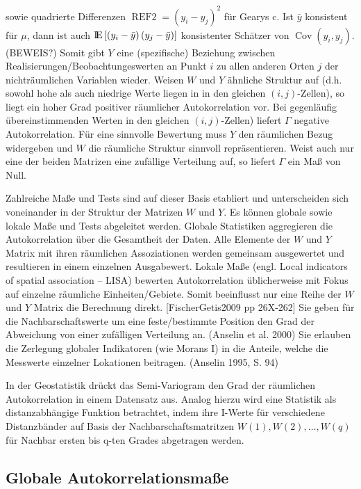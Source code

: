 sowie quadrierte Differenzen $\operatorname{REF2}=\left( y_i-y_j \right)^2$ für Gearys c. 
Ist $\bar{y}$ konsistent für $\mu$, dann ist auch ${\rm I\!E}\left[ \left(y_i-\bar{y}\right)\left(y_j-\bar{y}\right) \right]$ 
konsistenter Schätzer von $\operatorname{Cov} \left( y_i , y_j \right)$. (BEWEIS?)
Somit gibt $Y$ eine (spezifische) Beziehung zwischen Realisierungen/Beobachtungeswerten an Punkt $i$ 
zu allen anderen Orten $j$ der nichträumlichen Variablen wieder. 
Weisen $W$ und $Y$ ähnliche Struktur auf (d.h. sowohl hohe als auch niedrige Werte liegen in in den 
gleichen $\left(i,j\right)$-Zellen), so liegt ein hoher Grad positiver räumlicher Autokorrelation vor. 
Bei gegenläufig übereinstimmenden Werten in den gleichen $(i,j)$-Zellen) liefert $\Gamma$ negative Autokorrelation. 
Für eine sinnvolle Bewertung muss $Y$ den räumlichen Bezug widergeben und $W$ die räumliche Struktur sinnvoll repräsentieren. 
Weist auch nur eine der beiden Matrizen eine zufällige Verteilung auf, so liefert $\Gamma$ ein Maß von Null.

Zahlreiche Maße und Tests sind auf dieser Basis etabliert und unterscheiden sich voneinander in der Struktur der Matrizen $W$ und $Y$. 
Es können globale sowie lokale Maße und Tests abgeleitet werden. 
Globale Statistiken aggregieren die Autokorrelation über die Gesamtheit der Daten. 
Alle Elemente der $W$ und $Y$ Matrix mit ihren räumlichen Assoziationen werden gemeinsam ausgewertet und resultieren in einem einzelnen Ausgabewert.
Lokale Maße (engl. Local indicators of spatial association – LISA) bewerten Autokorrelation üblicherweise mit Fokus auf einzelne räumliche Einheiten/Gebiete. 
Somit beeinflusst nur eine Reihe der $W$ und $Y$ Matrix die Berechnung direkt. [FischerGetis2009 pp 26X-262]
Sie geben für die Nachbarschaftswerte um eine feste/bestimmte Position den Grad der Abweichung von einer zufälligen Verteilung an. (Anselin et al. 2000) 
Sie erlauben die Zerlegung globaler Indikatoren (wie Morans I) in die Anteile, welche die Messwerte einzelner Lokationen beitragen. (Anselin 1995, S. 94)

In der Geostatistik drückt das Semi-Variogram den Grad der räumlichen Autokorrelation in einem Datensatz aus. 
Analog hierzu wird eine Statistik als distanzabhängige Funktion betrachtet, indem ihre I-Werte für verschiedene Distanzbänder auf Basis der 
Nachbarschaftsmatritzen $W(1), W(2),\ldots,W(q)$ für Nachbar ersten bis q-ten Grades abgetragen werden.

\subsection{Globale Autokorrelationsmaße}

